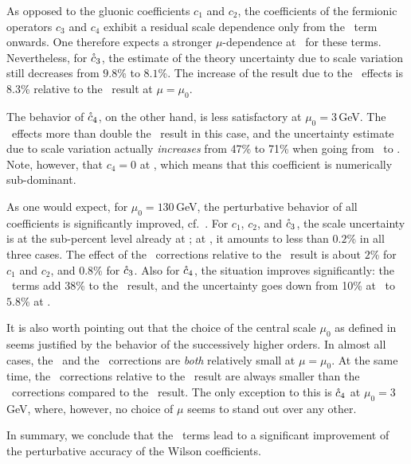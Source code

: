 As opposed to the gluonic coefficients $c_1$ and $c_2$, the coefficients
of the fermionic operators $c_3$ and $c_4$ exhibit a residual scale
dependence only from the \nlo\ term onwards. One therefore expects a
stronger $\mu$-dependence at \nnlo\ for these terms. Nevertheless, for
$\mathring{c}_3$, the estimate of the theory uncertainty due to scale
variation still decreases from $9.8$\% to $8.1$\%. The increase of the
result due to the \nnlo\ effects is $8.3$\% relative to the \nlo\ result
at $\mu=\mu_0$.

The behavior of $\mathring{c}_4$, on the other hand, is less
satisfactory at $\mu_0=3$\,GeV. The \nnlo\ effects more than double the
\nlo\ result in this case, and the uncertainty estimate due to scale
variation actually \textit{increases} from 47\% to 71\% when going from
\nlo\ to \nnlo.  Note, however, that $c_4=0$ at \lo, which means that
this coefficient is numerically sub-dominant.

As one would expect, for $\mu_0=130$\,GeV, the perturbative behavior of
all coefficients is significantly improved, cf.\ . For
$c_1$, $c_2$, and $\mathring{c}_3$, the scale uncertainty is at the
sub-percent level already at \nlo; at \nnlo, it amounts to less than
$0.2$\% in all three cases. The effect of the \nnlo\ corrections
relative to the \nlo\ result is about $2$\% for $c_1$ and $c_2$, and
$0.8$\% for $\mathring{c}_3$. Also for $\mathring{c}_4$, the
situation improves significantly: the \nnlo\ terms add 38\% to the
\nlo\ result, and the uncertainty goes down from 10\% at \nlo\ to
$5.8$\% at \nnlo.

It is also worth pointing out that the choice of the central scale
$\mu_0$ as defined in  seems justified by the behavior of
the successively higher orders. In almost all cases, the \nlo\ and the
\nnlo\ corrections are \textit{both} relatively small at $\mu=\mu_0$. At
the same time, the \nnlo\ corrections relative to the \nlo\ result are
always smaller than the \nlo\ corrections compared to the
\lo\ result. The only exception to this is $\mathring{c}_4$ at $\mu_0=3$\,GeV,
where, however, no choice of $\mu$ seems to stand out over any other.


In summary, we conclude that the \nnlo\ terms lead to a significant
improvement of the perturbative accuracy of the Wilson coefficients.
